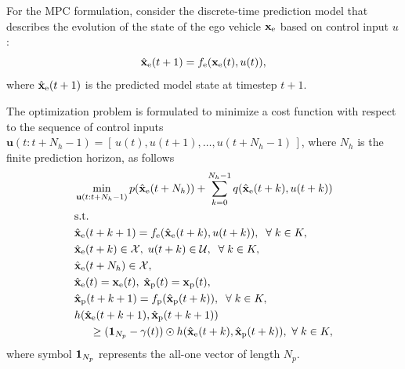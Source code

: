 \documentclass[journal]{IEEEtran}
\begin{document}
For the MPC formulation, consider the discrete-time prediction model that describes the evolution of the state of the ego vehicle $\mathbf{x}_{\rm e}$ based on control input $u$:
\begin{equation}
    \hat{\mathbf{x}}_{\rm e}(t+1) = f_{\rm e}(\mathbf{x}_{\rm e}(t), u(t)),
\label{f_e}
\end{equation}
where $\hat{\mathbf{x}}_{\rm e}(t+1)$ is the predicted model state at timestep $t+1$.

The optimization problem is formulated to minimize a cost function with respect to the sequence of control inputs $\mathbf{u}(t:t+N_h-1) = [\,u(t), u(t+1), \hdots, u(t+ N_h -1)\,]$, where $N_h$ is the finite prediction horizon, as follows
\begin{subequations}
\begin{align}
& \min_{\mathbf{u}(t:t+N_h-1)}  p(\hat{\mathbf{x}}_{\rm e}(t+N_h)) + \sum_{k=0}^{N_h-1} q(\hat{\mathbf{x}}_{\rm e}(t+k), u(t+k)) \label{cost}\\
&\text{s.t.} \quad \nonumber \\
& \hat{\mathbf{x}}_{\rm e}(t+k+1) = f_{\rm e}(\hat{\mathbf{x}}_{\rm e}(t+k), u(t+k)), \;\; \forall \; k \in K, \label{pred}\\
& \hat{\mathbf{x}}_{\rm e}(t+k) \in \mathcal{X}, \; u(t+k) \in \mathcal{U}, \;\; \forall \; k  \in K, \label{bounds}\\
& \hat{\mathbf{x}}_{\rm e}(t + N_h) \in \mathcal{X}, \label{bound}\\
 & \hat{\mathbf{x}}_{\rm e}(t) = \mathbf{x}_{\rm e}(t), \; \hat{\mathbf{x}}_{\rm p}(t) = \mathbf{x}_{\rm p}(t),\\
& \hat{\mathbf{x}}_{\rm p}(t + k + 1) = f_{\rm p}(\hat{\mathbf{x}}_{\rm p}(t + k)), \;\; \forall \; k \in K,\label{ped_predict}\\
&  h(\hat{\mathbf{x}}_{\rm e}(t+k+1), \hat{\mathbf{x}}_{\rm p}(t+k+1)) \nonumber \\ 
& \hspace{.5cm} \geq ({\bf 1}_{N_p}-\gamma(t)) \odot h(\hat{\mathbf{x}}_{\rm e}(t+k), \hat{\mathbf{x}}_{\rm p}(t+k)),\ \forall \; k \in K, \label{cbf_imp}
\end{align}
\label{proposed}
\end{subequations}
where symbol ${\bf 1}_{N_p}$ represents the all-one vector of length $N_p$.
\end{document}
